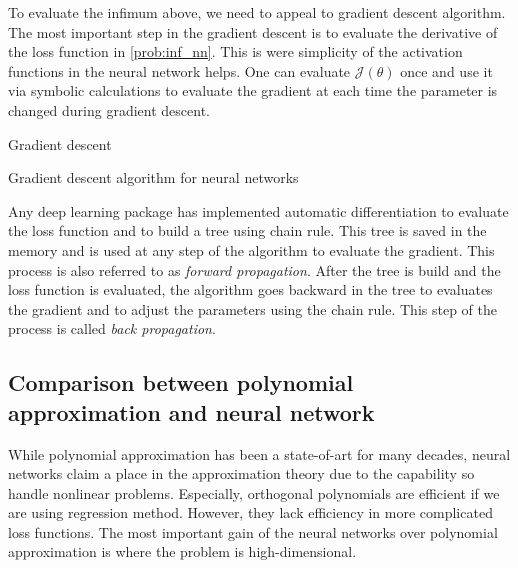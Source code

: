 \documentclass[11pt]{book}
\begin{document}
To evaluate the infimum above, we need to appeal to gradient descent algorithm. The most important step in the gradient descent is to evaluate the derivative of the loss function in \eqref{prob:inf_nn}. This is were simplicity of the activation functions in the neural network helps. One can evaluate $\mathcal{J}(\theta)$ once and use it via symbolic calculations to evaluate the gradient at each time the parameter is changed during gradient descent. 
\begin{algorithm}
        \caption{Gradient descent}
        \label{alg:gd_nn}
        \caption{Gradient descent algorithm for neural networks}
\end{algorithm}
Any deep learning package has implemented automatic differentiation to evaluate the loss function and to build a tree using chain rule. This tree is saved in the memory and is used at any step of the algorithm to evaluate the gradient. This process is also referred to as \emph{forward propagation}. After the tree is build and the loss function is evaluated, the algorithm goes backward in the tree to evaluates the gradient and to adjust the parameters using the chain rule. This step of the process is called \emph{back propagation}.

\subsection{Comparison between polynomial approximation and neural network}
While polynomial approximation has been a state-of-art for many decades, neural networks claim a place in the approximation theory due to the capability so handle nonlinear problems. Especially, orthogonal polynomials are efficient if we are using regression method. However, they lack efficiency in more complicated loss functions. The most important gain of the neural networks over polynomial approximation is where the problem is high-dimensional. 

\end{document}
